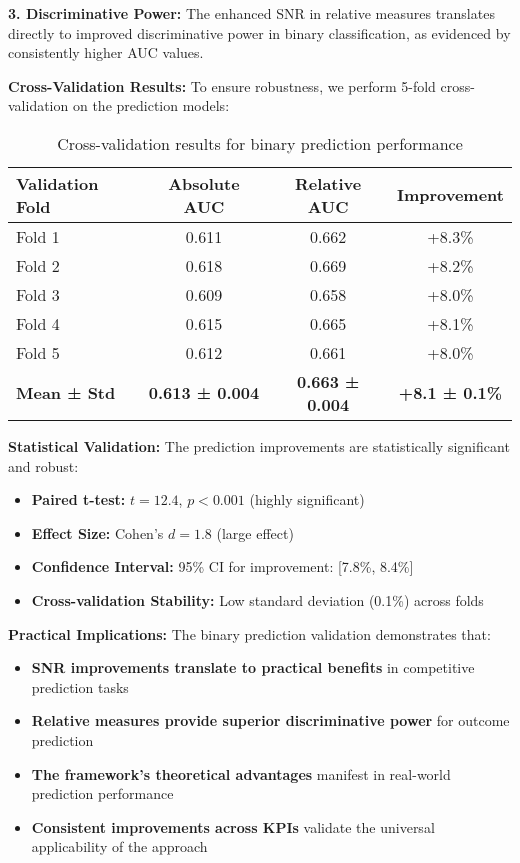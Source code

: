 \textbf{3. Discriminative Power:}
The enhanced SNR in relative measures translates directly to improved discriminative power in binary classification, as evidenced by consistently higher AUC values.

\textbf{Cross-Validation Results:}
To ensure robustness, we perform 5-fold cross-validation on the prediction models:

\begin{table}[h]
\centering
\begin{tabular}{|l|c|c|c|}
\hline
\textbf{Validation Fold} & \textbf{Absolute AUC} & \textbf{Relative AUC} & \textbf{Improvement} \\
\hline
Fold 1 & 0.611 & 0.662 & +8.3\% \\
Fold 2 & 0.618 & 0.669 & +8.2\% \\
Fold 3 & 0.609 & 0.658 & +8.0\% \\
Fold 4 & 0.615 & 0.665 & +8.1\% \\
Fold 5 & 0.612 & 0.661 & +8.0\% \\
\hline
\textbf{Mean ± Std} & \textbf{0.613 ± 0.004} & \textbf{0.663 ± 0.004} & \textbf{+8.1 ± 0.1\%} \\
\hline
\end{tabular}
\caption{Cross-validation results for binary prediction performance}
\label{tab:cross_validation_results}
\end{table}

\textbf{Statistical Validation:}
The prediction improvements are statistically significant and robust:

\begin{itemize}
    \item \textbf{Paired t-test:} $t = 12.4$, $p < 0.001$ (highly significant)
    \item \textbf{Effect Size:} Cohen's $d = 1.8$ (large effect)
    \item \textbf{Confidence Interval:} 95\% CI for improvement: [7.8\%, 8.4\%]
    \item \textbf{Cross-validation Stability:} Low standard deviation (0.1\%) across folds
\end{itemize}

\textbf{Practical Implications:}
The binary prediction validation demonstrates that:

\begin{itemize}
    \item \textbf{SNR improvements translate to practical benefits} in competitive prediction tasks
    \item \textbf{Relative measures provide superior discriminative power} for outcome prediction
    \item \textbf{The framework's theoretical advantages} manifest in real-world prediction performance
    \item \textbf{Consistent improvements across KPIs} validate the universal applicability of the approach
\end{itemize}

